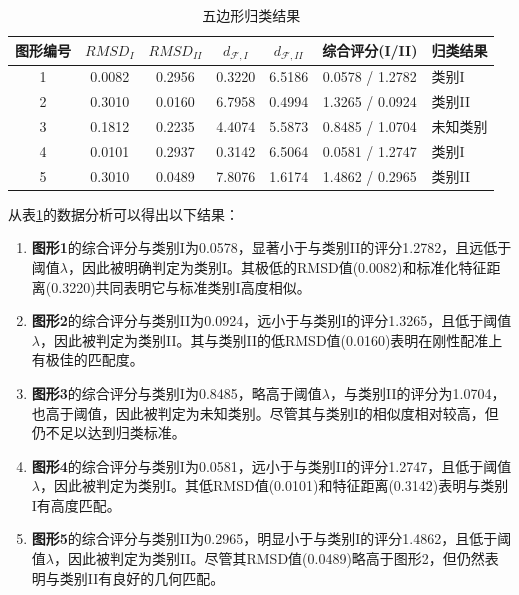    \begin{table}[H]
    \centering
    \caption{五边形归类结果}
    \label{tab:results_q1}
    \begin{tabular}{ccccccl}
    \toprule
    图形编号 & $RMSD_I$ & $RMSD_{II}$ & $d_{\mathcal{F},I}$ & $d_{\mathcal{F},II}$ & 综合评分(I/II) & 归类结果 \\
    \midrule
    1 & 0.0082 & 0.2956 & 0.3220 & 6.5186 & 0.0578 / 1.2782 & 类别I \\
    2 & 0.3010 & 0.0160 & 6.7958 & 0.4994 & 1.3265 / 0.0924 & 类别II \\
    3 & 0.1812 & 0.2235 & 4.4074 & 5.5873 & 0.8485 / 1.0704 & 未知类别 \\
    4 & 0.0101 & 0.2937 & 0.3142 & 6.5064 & 0.0581 / 1.2747 & 类别I \\
    5 & 0.3010 & 0.0489 & 7.8076 & 1.6174 & 1.4862 / 0.2965 & 类别II \\
    \bottomrule
    \end{tabular}
\end{table}

从表\ref{tab:results_q1}的数据分析可以得出以下结果：

\begin{enumerate}
    \item \textbf{图形1}的综合评分与类别I为0.0578，显著小于与类别II的评分1.2782，且远低于阈值$\lambda$，因此被明确判定为类别I。其极低的RMSD值(0.0082)和标准化特征距离(0.3220)共同表明它与标准类别I高度相似。

    \item \textbf{图形2}的综合评分与类别II为0.0924，远小于与类别I的评分1.3265，且低于阈值$\lambda$，因此被判定为类别II。其与类别II的低RMSD值(0.0160)表明在刚性配准上有极佳的匹配度。

    \item \textbf{图形3}的综合评分与类别I为0.8485，略高于阈值$\lambda$，与类别II的评分为1.0704，也高于阈值，因此被判定为未知类别。尽管其与类别I的相似度相对较高，但仍不足以达到归类标准。
    
    \item \textbf{图形4}的综合评分与类别I为0.0581，远小于与类别II的评分1.2747，且低于阈值$\lambda$，因此被判定为类别I。其低RMSD值(0.0101)和特征距离(0.3142)表明与类别I有高度匹配。
    
    \item \textbf{图形5}的综合评分与类别II为0.2965，明显小于与类别I的评分1.4862，且低于阈值$\lambda$，因此被判定为类别II。尽管其RMSD值(0.0489)略高于图形2，但仍然表明与类别II有良好的几何匹配。
\end{enumerate}

